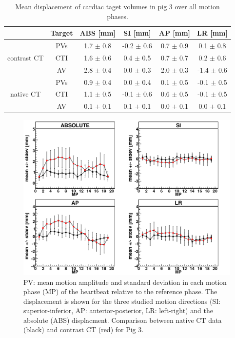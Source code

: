 \begin{table}[H]
  \centering
  \small
  \caption{Mean displacement of cardiac taget volumes in pig 3 over all motion phases.}
  \begin{tabular}{|c|c|c|c|c|c|}
    \hline\hline
    & Target & ABS [mm] & SI [mm] & AP [mm] & LR [mm] \\
    \hline\hline
    & PVs & 1.7 $\pm$ 0.8 & -0.2 $\pm$ 0.6 & 0.7 $\pm$ 0.9 & 0.1 $\pm$ 0.8 \\
    contrast CT & CTI & 1.6 $\pm$ 0.6 & 0.4 $\pm$ 0.5 & 0.7 $\pm$ 0.7 & 0.2 $\pm$ 0.6 \\
    & AV &  2.8 $\pm$ 0.4 & 0.0 $\pm$ 0.3 & 2.0 $\pm$ 0.3 & -1.4 $\pm$ 0.6 \\
    \hline
    & PVs & 0.9 $\pm$ 0.4 & 0.0 $\pm$ 0.4 & 0.1 $\pm$ 0.5 & -0.1 $\pm$ 0.5 \\
    native CT & CTI & 1.1 $\pm$ 0.5 & -0.1 $\pm$ 0.6 & 0.6 $\pm$ 0.5 & -0.1 $\pm$ 0.5 \\
    & AV & 0.1 $\pm$ 0.1 & 0.1 $\pm$ 0.1 & 0.0 $\pm$ 0.1 & 0.0 $\pm$ 0.1 \\
    \hline\hline
  \end{tabular}
  \label{tab:motion_native_vs_contrast}
\end{table}


\newpage

\begin{figure}[H]
\begin{center}
 \includegraphics[scale=0.22]{./teile/results_porcine/Mayo_IPV_HB_NATIV_VS_CONTRAST.png}
\caption{PV: mean motion amplitude and standard deviation in each motion phase (MP) of the heartbeat relative to the reference phase. The 
displacement is shown for the three studied motion directions (SI: superior-inferior, AP: anterior-posterior, LR: left-right) and the absolute 
(ABS) displacment. Comparison between native CT data (black) and contrast CT (red) for Pig 3.}
\label{motion_hb_pv_contrast_native}
\end{center}
\end{figure}

